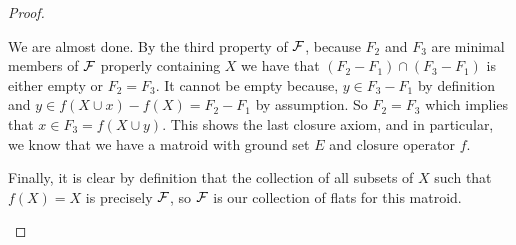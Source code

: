 \begin{proof}
\begin{enumerate}
\begin{enumerate}
     We are almost done. By the third property of $\mathcal{F}$, because $F_2$ and $F_3$ are minimal members of $\mathcal{F}$ properly containing $X$ we have that $(F_2-F_1)\cap (F_3 - F_1)$ is either empty or $F_2 = F_3$. It cannot be empty because, $y \in F_3 - F_1$ by definition and $y \in f(X\cup x)-f(X) = F_2 - F_1$ by assumption. So $F_2 = F_3$ which implies that $x \in F_3 = f(X \cup y).$ This shows the last closure axiom, and in particular, we know that we have a matroid with ground set $E$ and closure operator $f.$


     Finally, it is clear by definition that the collection of all subsets of $X$ such that $f(X) = X$ is precisely $\mathcal{F}$, so $\mathcal{F}$ is our collection of flats for this matroid.
     
\end{enumerate}

\end{enumerate}
    
\end{proof}
